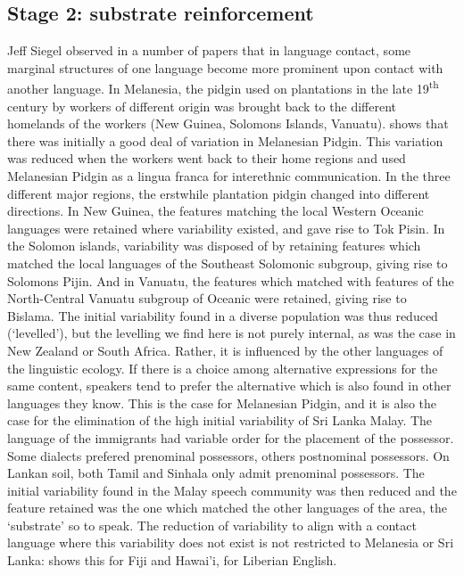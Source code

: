 \subsection{Stage 2: substrate reinforcement}
Jeff Siegel observed in a number of papers that in language contact, some marginal structures of one language become more prominent upon contact with another language.
In Melanesia, the pidgin used on plantations in the late 19\textsuperscript{th} century by workers of different origin was brought back to the different homelands of the workers (New Guinea, Solomons Islands, Vanuatu). \citet[349-350]{Siegel1998substrate} shows that there was initially a good deal of variation in Melanesian Pidgin. This variation was reduced when the workers went back to their home regions and used Melanesian Pidgin as a lingua franca for interethnic communication. In the three different major regions, the erstwhile plantation pidgin changed into different directions. In New Guinea, the features matching the local  Western Oceanic languages were retained where variability existed, and gave rise to Tok Pisin. In the Solomon islands, variability was disposed of by retaining features which matched the local
languages of the Southeast Solomonic subgroup, giving rise to Solomons Pijin. And in Vanuatu, the features which matched with features of the North-Central Vanuatu subgroup of Oceanic were retained, giving rise to Bislama. The initial variability found in a diverse population was thus reduced (`levelled'), but the levelling we find here is not purely internal, as was the case in New Zealand or South Africa. Rather, it is influenced by the other languages of the linguistic ecology. If there is a choice among alternative expressions for the same content, speakers tend to prefer the alternative which is also found in other languages they know. This is the case for Melanesian Pidgin, and it is also the case for the elimination of the high initial variability of Sri Lanka Malay. The language of the immigrants had variable order for the placement of the possessor. Some dialects prefered prenominal possessors, others postnominal possessors. On Lankan soil, both Tamil and Sinhala only admit prenominal possessors. The initial variability found in the Malay speech community was then reduced and the feature retained was the one which matched the other languages of the area, the `substrate' so to speak. The reduction of variability to align with a contact language where this variability does not exist is not restricted to Melanesia or Sri Lanka: \citet{Siegel1987,Siegel2000lis} shows this for Fiji and Hawai'i, \citet{Singler1988} for Liberian English.
 

